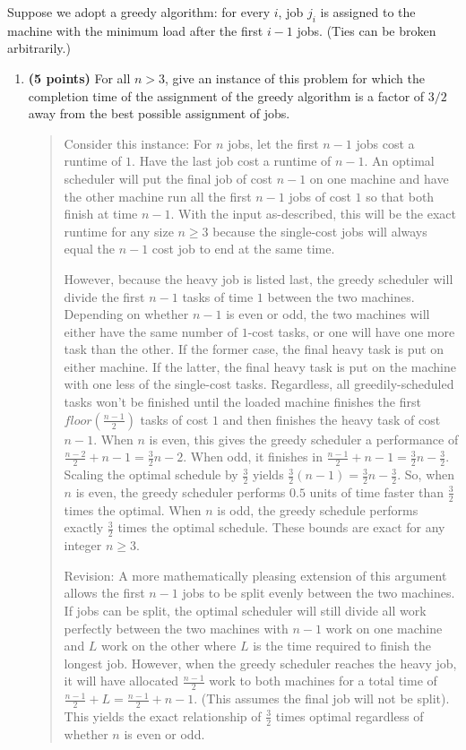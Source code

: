 \documentclass[11pt]{article}
\begin{document}
\begin{enumerate}
Suppose we adopt a greedy algorithm: for every $i$, job $j_i$ is assigned to the
machine with the minimum load after the first $i-1$ jobs.  (Ties can
be broken arbitrarily.) 
\begin{enumerate}
\item
{\bf (5 points)} 
For all $n > 3$, give an instance of this problem for which
the completion time of the assignment of the greedy algorithm is a factor of $3/2$ away from the best
possible assignment of jobs.
\begin{quote}
  \color{purple}
Consider this instance: For $n$ jobs, let the first $n - 1$ jobs cost a runtime of $1$. Have the last job cost a runtime of $n - 1$. An optimal scheduler will put the final job of cost $n - 1$ on one machine and have the other machine run all the first $n - 1$ jobs of cost $1$ so that both finish at time $n - 1$. With the input as-described, this will be the exact runtime for any size $n \geq 3$ because the single-cost jobs will always equal the $n - 1$ cost job to end at the same time.

\medskip
However, because the heavy job is listed last, the greedy scheduler will divide the first $n - 1$ tasks of time $1$ between the two machines. Depending on whether $n - 1$ is even or odd, the two machines will either have the same number of $1$-cost tasks, or one will have one more task than the other. If the former case, the final heavy task is put on either machine. If the latter, the final heavy task is put on the machine with one less of the single-cost tasks. Regardless, all greedily-scheduled tasks won't be finished until the loaded machine finishes the first $floor(\frac{n - 1}{2})$ tasks of cost $1$ and then finishes the heavy task of cost $n - 1$. When $n$ is even, this gives the greedy scheduler a performance of $\frac{n - 2}{2} + n - 1 = \frac{3}{2}n - 2$. When odd, it finishes in $\frac{n - 1}{2} + n - 1 = \frac{3}{2}n - \frac{3}{2}$. Scaling the optimal schedule by $\frac{3}{2}$ yields $\frac{3}{2}(n - 1) = \frac{3}{2}n - \frac{3}{2}$. So, when $n$ is even, the greedy scheduler performs $0.5$ units of time faster than $\frac{3}{2}$ times the optimal. When $n$ is odd, the greedy schedule performs exactly $\frac{3}{2}$ times the optimal schedule. These bounds are exact for any integer $n \geq 3$.

\medskip
Revision: A more mathematically pleasing extension of this argument allows the first $n - 1$ jobs to be split evenly between the two machines. If jobs can be split, the optimal scheduler will still divide all work perfectly between the two machines with $n - 1$ work on one machine and $L$ work on the other where $L$ is the time required to finish the longest job. However, when the greedy scheduler reaches the heavy job, it will have allocated $\frac{n - 1}{2}$ work to both machines for a total time of $\frac{n - 1}{2} + L = \frac{n - 1}{2} + n - 1$. (This assumes the final job will not be split). This yields the exact relationship of $\frac{3}{2}$ times optimal regardless of whether $n$ is even or odd.


\end{quote}
\end{enumerate}
\end{enumerate}
\end{document}
